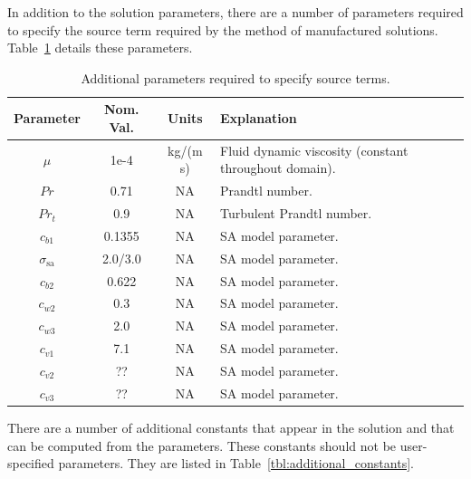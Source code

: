 %
In addition to the solution parameters, there are a number of
parameters required to specify the source term required by the method
of manufactured solutions.  Table~\ref{tbl:source_parameters} details
these parameters.
%
\begin{table}[ht]
\caption{Additional parameters required to specify source terms.}
\begin{center}
\begin{tabular}{|c|c|c|l|}
\hline
Parameter & Nom. Val. & Units & Explanation \\
\hline
$\mu$ & 1e-4 & kg/(m s) & Fluid dynamic viscosity (constant throughout domain). \\
$Pr$ & 0.71 & NA & Prandtl number. \\
$Pr_t$ & 0.9 & NA & Turbulent Prandtl number. \\
$c_{b1}$ & 0.1355 & NA & SA model parameter. \\
$\sigma_{\mathrm{sa}}$ & 2.0/3.0 & NA & SA model parameter. \\
$c_{b2}$ & 0.622 & NA & SA model parameter. \\
$c_{w2}$ & 0.3 & NA & SA model parameter. \\
$c_{w3}$ & 2.0 & NA & SA model parameter. \\
$c_{v1}$ & 7.1 & NA & SA model parameter. \\
$c_{v2}$ & ?? & NA & SA model parameter. \\
$c_{v3}$ & ?? & NA & SA model parameter. \\
\hline
\end{tabular}
\end{center}
\label{tbl:source_parameters}
\end{table}
%
There are a number of additional constants that appear in the solution
and that can be computed from the parameters.  These constants should
not be user-specified parameters.  They are listed in
Table~\ref{tbl:additional_constants}.
%
